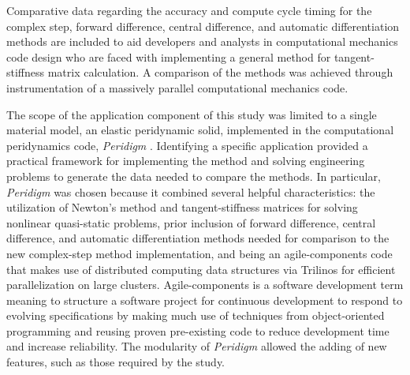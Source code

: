 \documentclass[preprint,12pt]{elsarticle}
\begin{document}
Comparative data regarding the accuracy and compute cycle timing for the
complex step, forward difference, central difference, and automatic
differentiation methods are included to aid developers and analysts in
computational mechanics code design who are faced with implementing a general
method for tangent-stiffness matrix calculation.  A comparison of the methods was achieved through instrumentation of a
massively parallel computational mechanics code. 

The scope of the application component of this study was limited to a single
material model, an elastic peridynamic solid, implemented in the computational
peridynamics code, \textit{Peridigm} \cite{peridigm}. Identifying a specific
application provided a practical framework for implementing the
 method and solving engineering
problems to generate the data needed to compare the methods. In particular,
\emph{Peridigm} was chosen because it combined several helpful
characteristics: the utilization of Newton's method and tangent-stiffness
matrices for solving nonlinear quasi-static problems, prior inclusion of
forward difference, central difference, and automatic differentiation
methods needed for comparison to the new complex-step method
implementation, and being an agile-components code that makes use of
distributed computing data structures via Trilinos \cite{trilinos} for
efficient parallelization on large clusters. Agile-components is a software
development term meaning to structure a software project for continuous
development to respond to evolving specifications by making much use of
techniques from object-oriented programming and reusing proven pre-existing
code to reduce development time and increase reliability. The modularity of
\emph{Peridigm} allowed the adding of new features, such as those required by the
study.
\end{document}
